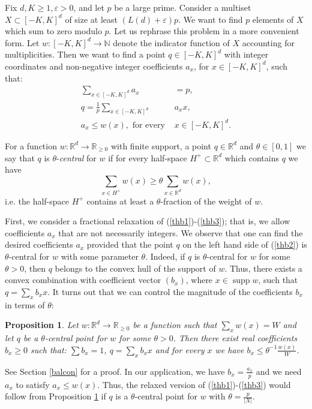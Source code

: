 \documentclass{daj}
\renewcommand{\le}{\leqslant}
\renewcommand{\ge}{\geqslant}
\newcommand{\R}{\mathbb R}
\newcommand{\N}{\mathbb N}
\newtheorem{prop}[theorem]{Proposition}
\theoremstyle{definition}
\theoremstyle{remark}
\theoremstyle{definition}
\theoremstyle{definition}
\begin{document}
Fix $d, K \ge 1, \varepsilon>0$, and let $p$ be a large prime. Consider a multiset $X \subset [-K, K]^d$ of size at least $(L(d)+\varepsilon) p$. We want to find $p$ elements of $X$ which sum to zero modulo $p$. Let us rephrase this problem in a more convenient form. Let $w: [-K, K]^d \rightarrow \N$ denote the indicator function of $X$ accounting for multiplicities. Then we want to find a point $q \in [-K, K]^d$ with integer coordinates
and non-negative integer coefficients $a_x$, for $x \in [-K, K]^d$, such that:
\begin{align}\label{thb1}
    \sum_{x \in [-K, K]^d} a_x &= p,\\
    q = \frac{1}{p}\sum_{x \in [-K, K]^d} &a_x x,\label{thb2}\\
    a_x \le w(x),\text{ for every }&x\in[-K, K]^d.\label{thb3}
\end{align}


For a function $w: \R^d \rightarrow \R_{\ge 0}$ with finite support, a point $q \in \R^d$ and $\theta \in [0, 1]$ we say that $q$ is $\theta$-{\it central} for $w$ if for every half-space $H^+ \subset \R^d$ which contains $q$ we have
$$
\sum_{x \in H^+} w(x) \ge \theta \sum_{x \in \R^d} w(x),
$$
i.e. the half-space $H^+$ contains at least a $\theta$-fraction of the weight of $w$.  

First, we consider a fractional relaxation of (\ref{thb1})-(\ref{thb3}); that is, we allow coefficients $a_x$ that are not necessarily integers. We observe that one can find the desired coefficients $a_x$ provided that the point $q$ on the left hand side of (\ref{thb2}) is $\theta$-central for $w$ with some parameter $\theta$. Indeed, if $q$ is $\theta$-central for $w$ for some $\theta>0$, then $q$ belongs to the convex hull of the support of $w$. Thus, there exists a convex combination with coefficient vector $(b_x)$, where $x \in \operatorname{supp}w$, such that $q = \sum_x b_x x$. It turns out that we can control the magnitude of the coefficients $b_x$ in terms of $\theta$:

\begin{prop}\label{propb}
    Let $w:\R^d \rightarrow \R_{\ge 0}$ be a function such that $\sum_x w(x) = W$ and let $q$ be a $\theta$-central point for $w$ for some $\theta > 0$. Then there exist real coefficients $b_x \ge 0$ such that: $\sum b_x = 1$, $q = \sum_x b_x x$ and for every $x$ we have $b_x \le \theta^{-1} \frac{w(x)}{W}$.
\end{prop}

See Section \ref{balcon} for a proof. In our application, we have $b_x = \frac{a_x}{p}$ and we need $a_x$ to satisfy $a_x \le w(x)$. Thus, the relaxed version of (\ref{thb1})-(\ref{thb3}) would follow from Proposition \ref{propb} if $q$ is a $\theta$-central point for $w$ with $\theta = \frac{p}{|X|}$. 
\end{document}
